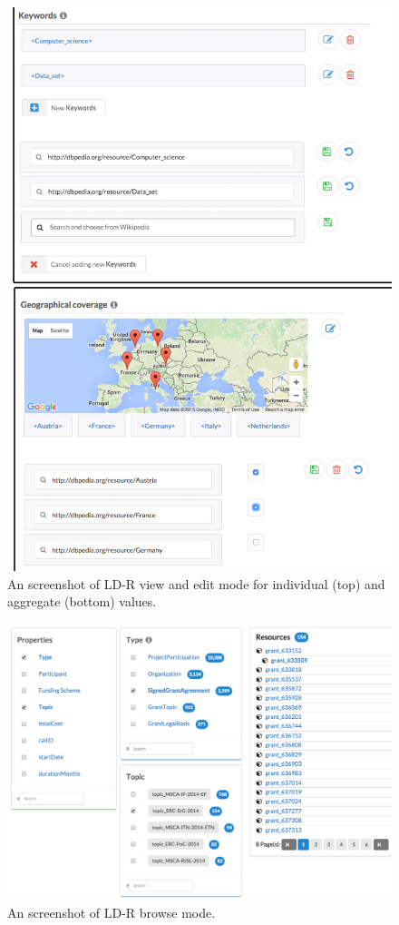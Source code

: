 \documentclass{acm_proc_article-sp}
\begin{document}
\begin{figure}[tb] 
  \includegraphics[width=1\linewidth]{images/viewedit.png}
  \caption{An screenshot of LD-R view and edit mode for individual (top) and aggregate (bottom) values.}
  \label{fig:ldrFacets}
\end{figure}

\begin{figure}[htb] 
  \includegraphics[width=1\linewidth]{images/facets.jpg}
  \caption{An screenshot of LD-R browse mode.}
  \label{fig:ldrFacets}
\end{figure}
\end{document}
